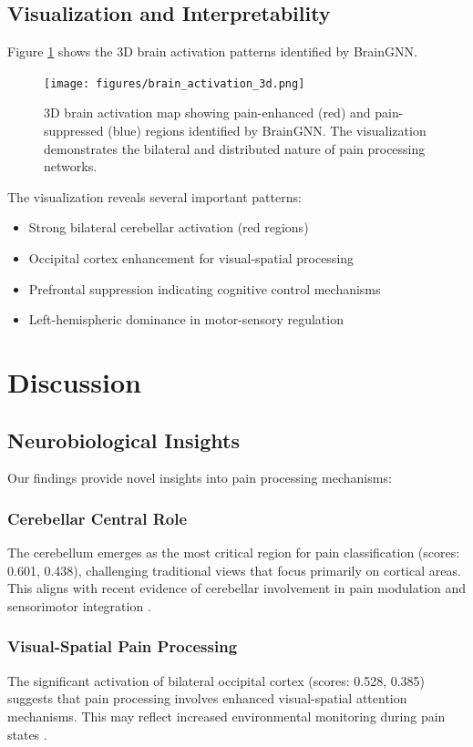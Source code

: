 \documentclass[10pt,journal,compsoc]{IEEEtran}
\begin{document}
\subsection{Visualization and Interpretability}

Figure \ref{fig:brain_activation} shows the 3D brain activation patterns identified by BrainGNN.

\begin{figure}[htbp]
\centering
\texttt{[image: figures/brain\_activation\_3d.png]}
\caption{3D brain activation map showing pain-enhanced (red) and pain-suppressed (blue) regions identified by BrainGNN. The visualization demonstrates the bilateral and distributed nature of pain processing networks.}
\label{fig:brain_activation}
\end{figure}

The visualization reveals several important patterns:
\begin{itemize}
\item Strong bilateral cerebellar activation (red regions)
\item Occipital cortex enhancement for visual-spatial processing
\item Prefrontal suppression indicating cognitive control mechanisms
\item Left-hemispheric dominance in motor-sensory regulation
\end{itemize}

\section{Discussion}

\subsection{Neurobiological Insights}

Our findings provide novel insights into pain processing mechanisms:

\subsubsection{Cerebellar Central Role}
The cerebellum emerges as the most critical region for pain classification (scores: 0.601, 0.438), challenging traditional views that focus primarily on cortical areas. This aligns with recent evidence of cerebellar involvement in pain modulation and sensorimotor integration \cite{cerebellum_pain_2023}.

\subsubsection{Visual-Spatial Pain Processing}
The significant activation of bilateral occipital cortex (scores: 0.528, 0.385) suggests that pain processing involves enhanced visual-spatial attention mechanisms. This may reflect increased environmental monitoring during pain states \cite{visual_pain_2022}.
\end{document}
